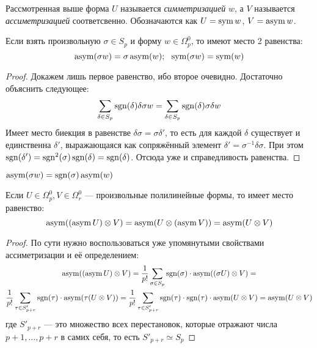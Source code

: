 \begin{definition}
	Рассмотренная выше форма $U$ называется \textit{симметризацией} $w$, а $V$ называется \textit{ассиметризацией} соответсвенно. Обозначаются как $U = \operatorname{sym} w$, $V = \operatorname{asym} w$.
\end{definition}

\begin{proposition}
	Если взять произвольную $\sigma \in S_p$ и форму $w \in \Omega_p^0$, то имеют место 2 равенства:
	\[
		\operatorname{asym}(\sigma w) = \sigma \operatorname{asym}(w);\ \ \operatorname{sym}(\sigma w) = \operatorname{sym}(w)
	\]
\end{proposition}

\begin{proof}
	Докажем лишь первое равенство, ибо второе очевидно. Достаточно объяснить следующее:
	\[
		\sum_{\delta \in S_p} \operatorname{sgn}(\delta) \delta \sigma w = \sum_{\delta \in S_p} \operatorname{sgn}(\delta) \sigma \delta w
	\]
	Имеет место биекция в равенстве $\delta \sigma = \sigma \delta'$, то есть для каждой $\delta$ существует и единственна $\delta'$, выражающаяся как сопряжённый элемент $\delta' = \sigma^{-1} \delta \sigma$. При этом $\operatorname{sgn}(\delta') = \operatorname{sgn}^2(\sigma) \operatorname{sgn}(\delta) = \operatorname{sgn}(\delta)$. Отсюда уже и справедливость равенства.
\end{proof}

\begin{corollary}
	\(\operatorname{asym}(\sigma w) = \operatorname{sgn}(\sigma) \operatorname{asym}(w)\)
\end{corollary}

\begin{lemma}
	Если $U \in \Omega_p^0, V \in \Omega_r^0$ --- произвольные полилинейные формы, то имеет место равенство:
	\[
		\operatorname{asym}((\operatorname{asym} U) \otimes V) = \operatorname{asym} (U \otimes (\operatorname{asym} V)) = \operatorname{asym}(U \otimes V)
	\]
\end{lemma}

\begin{proof}
	По сути нужно воспользоваться уже упомянутыми свойствами ассиметризации и её определением:
	\begin{multline*}
		\operatorname{asym}((\operatorname{asym} U) \otimes V) = \frac{1}{p!} \sum_{\sigma \in S_p} \operatorname{sgn}(\sigma) \cdot \operatorname{asym}((\sigma U) \otimes V) =
		\\
		\frac{1}{p!} \sum_{\tau \in S'_{p + r}} \operatorname{sgn}(\tau) \cdot \operatorname{asym}(\tau(U \otimes V)) = \frac{1}{p!} \sum_{\tau \in S'_{p + r}} \operatorname{sgn}(\tau) \cdot \operatorname{sgn}(\tau) \cdot \operatorname{asym}(U \otimes V) = \operatorname{asym}(U \otimes V)
	\end{multline*}
	где $S'_{p + r}$ --- это множество всех перестановок, которые отражают числа $p + 1, \ldots, p + r$ в самих себя, то есть $S'_{p + r} \simeq S_p$
\end{proof}

